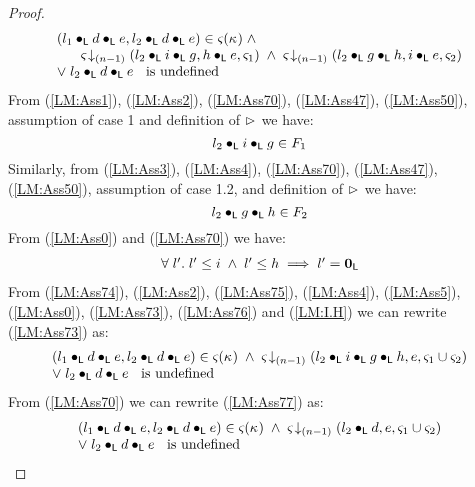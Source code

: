 \begin{lemma}[]
\begin{proof}
\begin{align}
	\begin{array}{l}
		(l_1 \bullet_{\textsf{L}} d \bullet_{\textsf{L}} e, l_2 \bullet_{\textsf{L}} d \bullet_{\textsf{L}} e) \in \varsigma_{}(\kappa_{}) \;\land\;\\
		\hspace*{0.6cm}\varsigma_{} \!\downarrow_{(n-1)} \left(l_2 \bullet_{\textsf{L}} i \bullet_{\textsf{L}} g, h \bullet_{\textsf{L}} e, \varsigma_{1}\right) \;\land\;
		\varsigma_{} \!\downarrow_{(n-1)} \left(l_2 \bullet_{\textsf{L}} g \bullet_{\textsf{L}} h, i \bullet_{\textsf{L}} e, \varsigma_{2}\right)\\
		\lor\; l_2 \bullet_{\textsf{L}} d \bullet_{\textsf{L}} e \hspace*{0.2cm}\text{ is undefined}
	\end{array} \label{LM:Ass73}
\end{align}
%
From (\ref{LM:Ass1}), (\ref{LM:Ass2}), (\ref{LM:Ass70}), (\ref{LM:Ass47}), (\ref{LM:Ass50}), assumption of case 1 and definition of $\rhd$ we have:
%
\begin{equation}
	l_2 \bullet_{\textsf{L}} i \bullet_{\textsf{L}} g \in F_1 \label{LM:Ass74}
\end{equation}
%
Similarly, from (\ref{LM:Ass3}), (\ref{LM:Ass4}), (\ref{LM:Ass70}), (\ref{LM:Ass47}), (\ref{LM:Ass50}), assumption of case 1.2, and definition of $\rhd$ we have:
%
\begin{equation}
	l_2 \bullet_{\textsf{L}} g \bullet_{\textsf{L}} h \in F_2 \label{LM:Ass75}
\end{equation}
From (\ref{LM:Ass0}) and (\ref{LM:Ass70}) we have:
\begin{align}
\begin{array}{l}
	\forall\; l'.\; l' \leq i \;\land\; l' \leq h \implies l' = \mathbf{0}_{\textsf{L}}
\end{array} \label{LM:Ass76}
\end{align}
From (\ref{LM:Ass74}), (\ref{LM:Ass2}), (\ref{LM:Ass75}), (\ref{LM:Ass4}), (\ref{LM:Ass5}), (\ref{LM:Ass0}),   (\ref{LM:Ass73}), (\ref{LM:Ass76}) and (\ref{LM:I.H}) we can rewrite (\ref{LM:Ass73}) as:
%
\begin{align}
	\begin{array}{l}
		(l_1 \bullet_{\textsf{L}} d \bullet_{\textsf{L}} e, l_2 \bullet_{\textsf{L}} d \bullet_{\textsf{L}} e) \in \varsigma_{}(\kappa_{}) \;\land\;\varsigma_{} \!\downarrow_{(n-1)} \left(l_2 \bullet_{\textsf{L}} i \bullet_{\textsf{L}} g \bullet_{\textsf{L}} h, e, \varsigma_{1} \cup \varsigma_{2}\right) \\
		\lor\; l_2 \bullet_{\textsf{L}} d \bullet_{\textsf{L}} e \hspace*{0.2cm}\text{ is undefined}
	\end{array} \label{LM:Ass77}
\end{align}
From (\ref{LM:Ass70}) we can rewrite (\ref{LM:Ass77}) as:
%
\begin{align}
	\begin{array}{l}
		(l_1 \bullet_{\textsf{L}} d \bullet_{\textsf{L}} e, l_2 \bullet_{\textsf{L}} d \bullet_{\textsf{L}} e) \in \varsigma_{}(\kappa_{}) \;\land\;\varsigma_{} \!\downarrow_{(n-1)} \left(l_2 \bullet_{\textsf{L}} d, e, \varsigma_{1} \cup \varsigma_{2}\right) \\
		\lor\; l_2 \bullet_{\textsf{L}} d \bullet_{\textsf{L}} e \hspace*{0.2cm}\text{ is undefined}
	\end{array}
	 \label{LM:Case3.1.2}
\end{align}


\end{proof}
\end{lemma}
